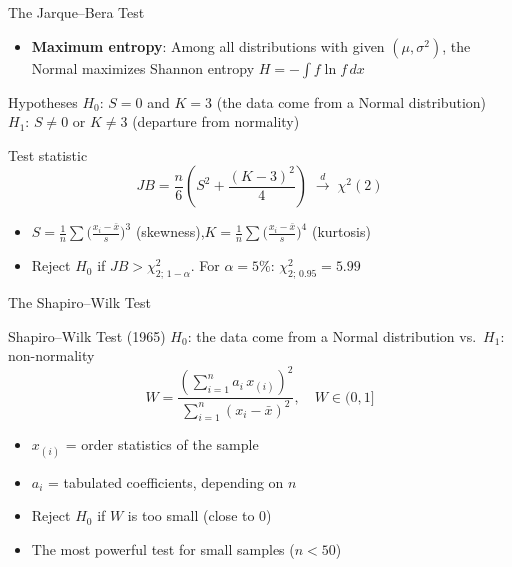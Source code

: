 \documentclass[9pt, aspectratio=169, t]{beamer}
\theoremstyle{definition}
\begin{document}
\begin{frame}{The Jarque--Bera Test}
\begin{itemize}
\item \textbf{Maximum entropy}: Among all distributions with given $(\mu, \sigma^2)$, the Normal maximizes Shannon entropy $H = -\!\int\! f\ln f\,dx$
\end{itemize}
\vspace{0.1cm}
\begin{block}{Hypotheses}
$H_0$: $S = 0$ and $K = 3$ (the data come from a Normal distribution)\\
$H_1$: $S \neq 0$ or $K \neq 3$ (departure from normality)
\end{block}
\vspace{0.1cm}
\begin{block}{Test statistic}
\vspace{-0.3cm}
\[
\boxed{\;JB = \frac{n}{6}\!\left(S^2 + \frac{(K-3)^2}{4}\right) \;\xrightarrow{d}\; \chi^2(2)\;}
\]
\vspace{-0.4cm}
\begin{itemize}\setlength\itemsep{0pt}
\item $S = \tfrac{1}{n}\sum\!\bigl(\tfrac{x_i - \bar{x}}{s}\bigr)^{3}$ (skewness),\quad $K = \tfrac{1}{n}\sum\!\bigl(\tfrac{x_i - \bar{x}}{s}\bigr)^{4}$ (kurtosis)
\item Reject $H_0$ if $JB > \chi^2_{2;\,1-\alpha}$.\; For $\alpha = 5\%$: $\chi^2_{2;\,0.95} = 5.99$
\end{itemize}
\end{block}
\end{frame}

\begin{frame}{The Shapiro--Wilk Test}
\begin{block}{Shapiro--Wilk Test (1965)}
$H_0$: the data come from a Normal distribution \quad vs.\ $H_1$: non-normality
\[
\boxed{\;W = \frac{\left(\sum_{i=1}^n a_i\, x_{(i)}\right)^2}{\sum_{i=1}^n (x_i - \bar{x})^2}, \quad W \in (0, 1]\;}
\]
\begin{itemize}
\item $x_{(i)}$ = order statistics of the sample
\item $a_i$ = tabulated coefficients, depending on $n$
\item Reject $H_0$ if $W$ is too small (close to 0)
\item The most powerful test for small samples ($n < 50$)
\end{itemize}
\end{block}
\end{frame}
\end{document}
